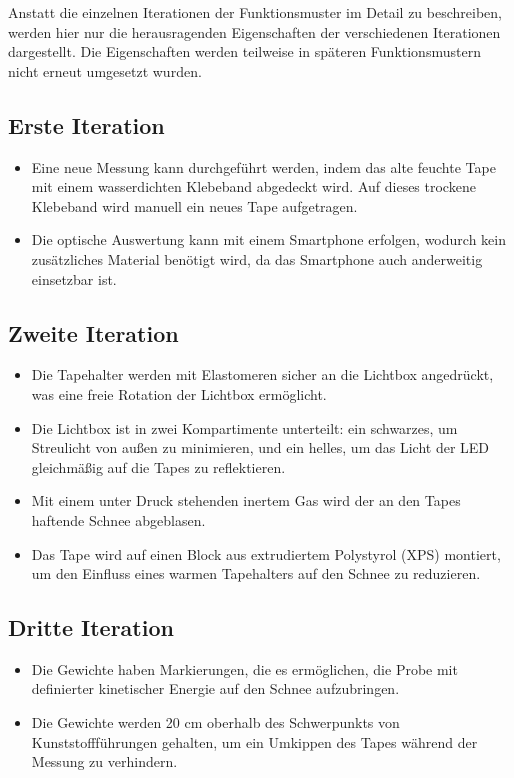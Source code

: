 




Anstatt die einzelnen Iterationen der Funktionsmuster im Detail zu beschreiben, werden hier nur die herausragenden Eigenschaften der verschiedenen Iterationen dargestellt. Die Eigenschaften werden teilweise in späteren Funktionsmustern nicht erneut umgesetzt wurden.


\subsection{Erste Iteration}

\begin{itemize}
    \item Eine neue Messung kann durchgeführt werden, indem das alte feuchte Tape mit einem wasserdichten Klebeband abgedeckt wird. Auf dieses trockene Klebeband wird manuell ein neues Tape aufgetragen.
    \item Die optische Auswertung kann mit einem Smartphone erfolgen, wodurch kein zusätzliches Material benötigt wird, da das Smartphone auch anderweitig einsetzbar ist.
\end{itemize}

\subsection{Zweite Iteration}

\begin{itemize}
    \item Die Tapehalter werden mit Elastomeren sicher an die Lichtbox angedrückt, was eine freie Rotation der Lichtbox ermöglicht.
    \item Die Lichtbox ist in zwei Kompartimente unterteilt: ein schwarzes, um Streulicht von außen zu minimieren, und ein helles, um das Licht der LED gleichmäßig auf die Tapes zu reflektieren.
    \item Mit einem unter Druck stehenden inertem Gas wird der an den Tapes haftende Schnee abgeblasen.
    \item Das Tape wird auf einen Block aus extrudiertem Polystyrol (XPS) montiert, um den Einfluss eines warmen Tapehalters auf den Schnee zu reduzieren.
\end{itemize}

\subsection{Dritte Iteration}

\begin{itemize}
    \item Die Gewichte haben Markierungen, die es ermöglichen, die Probe mit definierter kinetischer Energie auf den Schnee aufzubringen.
    \item Die Gewichte werden 20 cm oberhalb des Schwerpunkts von Kunststoffführungen gehalten, um ein Umkippen des Tapes während der Messung zu verhindern.
\end{itemize}

